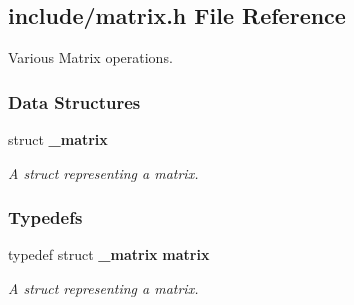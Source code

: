 \subsection{include/matrix.h File Reference}
\label{a00041}


Various Matrix operations.  


\subsubsection*{Data Structures}
\begin{DoxyCompactItemize}
\item 
struct \textbf{ \+\_\+matrix}
\begin{DoxyCompactList}\small\item\em A struct representing a matrix. \end{DoxyCompactList}\end{DoxyCompactItemize}
\subsubsection*{Typedefs}
\begin{DoxyCompactItemize}
\item 
typedef struct \textbf{ \+\_\+matrix} \textbf{ matrix}
\begin{DoxyCompactList}\small\item\em A struct representing a matrix. \end{DoxyCompactList}\end{DoxyCompactItemize}
